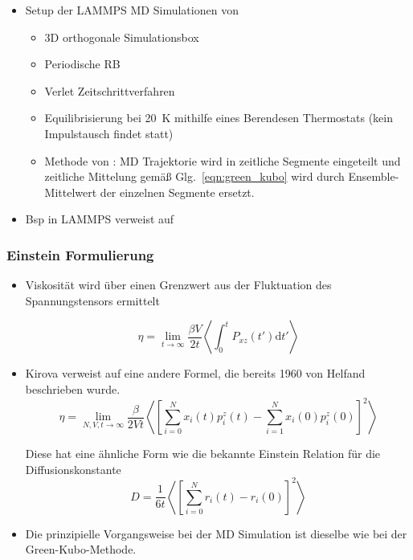 \documentclass[a4paper, 10pt, 
               numbers=noenddot, toc=graduated,
               headsepline=true, footsepline=true,
               twoside=false, titlepage=true, 
               bibliography=totoc]{scrartcl}
\newcommand{\refeqn}[1]  {Glg.~\ref{#1}}
\begin{document}
\begin{itemize}
    		 \item Setup der LAMMPS MD Simulationen von \cite{Kirova2015,Tenney2010} 
		 		\begin{itemize}
		 			\item 3D orthogonale Simulationsbox
		 			\item Periodische RB
		 			\item Verlet Zeitschrittverfahren
		 			\item Equilibrisierung bei \SI{20}{K} mithilfe eines Berendesen Thermostats (kein Impulstausch findet statt)
		 			\item Methode von \cite{Kirova2015}: MD Trajektorie wird in zeitliche Segmente eingeteilt und zeitliche Mittelung gemäß \refeqn{eqn:green_kubo} wird durch Ensemble-Mittelwert der einzelnen Segmente ersetzt.
		 		\end{itemize}
			 	
		 	\item Bsp in LAMMPS verweist auf \cite{Daivis1994}
		\end{itemize}

	\subsubsection{Einstein Formulierung}
		\begin{itemize}
			 \item Viskosität wird über einen Grenzwert aus der Fluktuation des Spannungstensors ermittelt \cite{Tenney2010}
			 
			 	\begin{equation}
					\eta = \lim_{t\to\infty} \frac{\beta V}{2 t} \left\langle \int_0^t P_{xz}(t')\mathrm{d}t' \right\rangle
				\end{equation}
				
			 \item Kirova \cite{Kirova2015} verweist auf eine andere Formel, die bereits 1960 von Helfand \cite{Helfand1960} beschrieben wurde.
			    \begin{equation}
					\eta = \lim_{N,V,t\to\infty} \frac{\beta}{2 V t} \left\langle \left[\sum_{i=0}^N x_i(t) p_i^z(t) - \sum_{i=1}^N x_i(0) p_i^z(0) \right]^2 \right\rangle
				\end{equation}
				
				Diese hat eine ähnliche Form wie die bekannte Einstein Relation für die Diffusionskonstante
				\begin{equation}
					D = \frac{1}{6t} \left\langle \left[ \sum_{i=0}^N r_i(t) - r_i(0) \right]^2 \right\rangle
				\end{equation}
			 
			 \item Die prinzipielle Vorgangsweise bei der MD Simulation ist dieselbe wie bei der Green-Kubo-Methode.
		\end{itemize}
\end{document}
